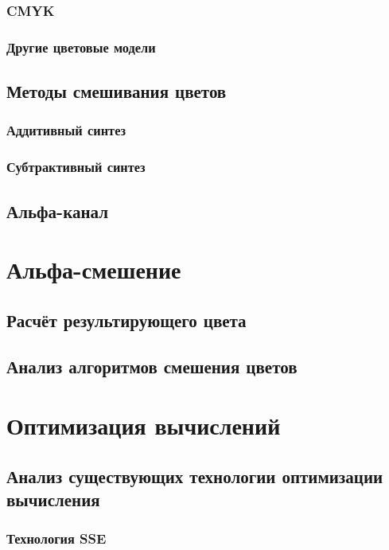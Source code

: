 \subsubsection{CMYK}

\subsubsection{Другие цветовые модели}
\subsection{Методы смешивания цветов}
\subsubsection{Аддитивный синтез}
\subsubsection{Субтрактивный синтез}
\subsection{Альфа-канал}

\section{Альфа-смешение}

\subsection{Расчёт результирующего цвета}

\subsection{Анализ  алгоритмов смешения цветов}
\subsection{}
\section{Оптимизация вычислений}
\subsection{Анализ существующих технологии оптимизации вычисления}
\subsubsection{Технология SSE}
